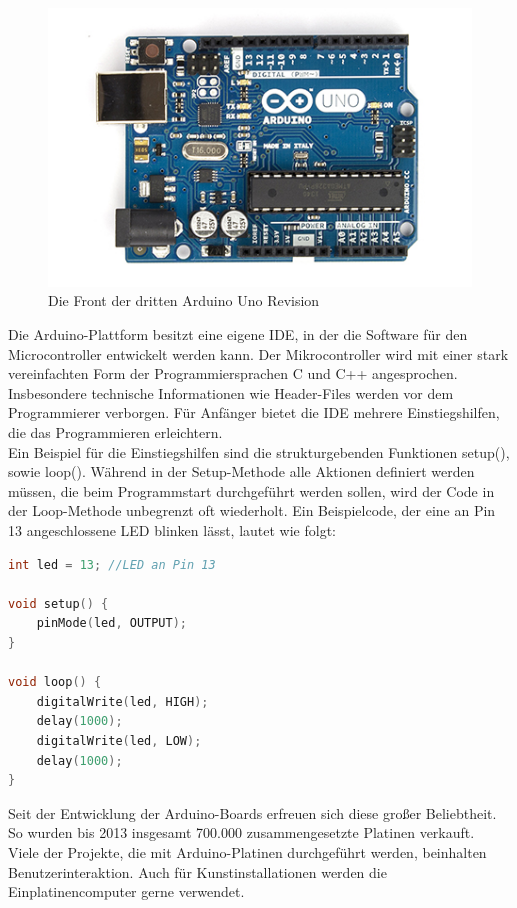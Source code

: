 \begin{figure}[H] 
	\centering
	\includegraphics[scale=0.6]{Bilder/arduinouno}
	\caption{Die Front der dritten Arduino Uno Revision\cite{i:arduinouno}}
	\label{f:arduinouno}
\end{figure}

Die Arduino-Plattform besitzt eine eigene \ac{IDE}, in der die Software für den Microcontroller entwickelt werden kann. Der Mikrocontroller wird mit einer stark vereinfachten Form der Programmiersprachen C und C++ angesprochen. Insbesondere technische Informationen wie Header-Files werden vor dem Programmierer verborgen. Für Anfänger bietet die \ac{IDE} mehrere Einstiegshilfen, die das Programmieren erleichtern.\\
Ein Beispiel für die Einstiegshilfen sind die strukturgebenden Funktionen setup(), sowie loop(). Während in der Setup-Methode alle Aktionen definiert werden müssen, die beim Programmstart durchgeführt werden sollen, wird der Code in der Loop-Methode unbegrenzt oft wiederholt.
Ein Beispielcode, der eine an Pin 13 angeschlossene LED blinken lässt, lautet wie folgt:\\

\begin{lstlisting}[language=c,caption={Simpler Arduino-Code, der eine LED blinken lässt},label=lst:blink,frame=single] 
int led = 13; //LED an Pin 13

void setup() {                
	pinMode(led, OUTPUT);     
}

void loop() {
	digitalWrite(led, HIGH);  
	delay(1000);               
	digitalWrite(led, LOW);   
	delay(1000);               
}
\end{lstlisting}

\vspace{1cm}

Seit der Entwicklung der Arduino-Boards erfreuen sich diese großer Beliebtheit. So wurden bis 2013 insgesamt 700.000 zusammengesetzte Platinen verkauft\cite{ws:sellnumb}.\\

Viele der Projekte, die mit Arduino-Platinen durchgeführt werden, beinhalten Benutzerinteraktion. Auch für Kunstinstallationen werden die Einplatinencomputer gerne verwendet\cite{ws:elektor}.
